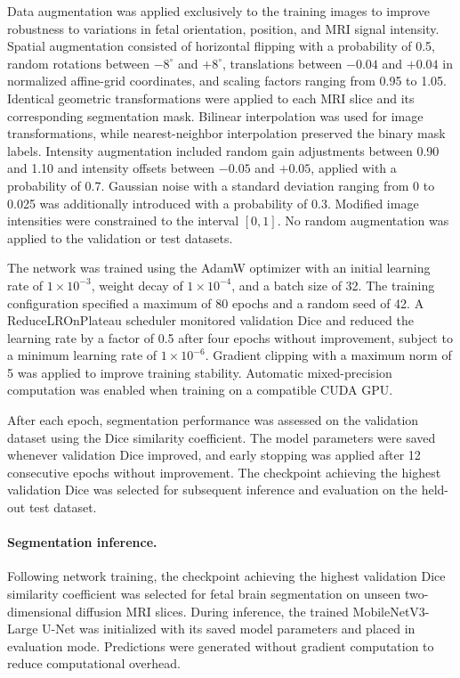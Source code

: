 Data augmentation was applied exclusively to the training images to improve robustness to variations in fetal orientation, position, and MRI signal intensity. Spatial augmentation consisted of horizontal flipping with a probability of 0.5, random rotations between $-8^\circ$ and $+8^\circ$, translations between $-0.04$ and $+0.04$ in normalized affine-grid coordinates, and scaling factors ranging from 0.95 to 1.05. Identical geometric transformations were applied to each MRI slice and its corresponding segmentation mask. Bilinear interpolation was used for image transformations, while nearest-neighbor interpolation preserved the binary mask labels. Intensity augmentation included random gain adjustments between 0.90 and 1.10 and intensity offsets between $-0.05$ and $+0.05$, applied with a probability of 0.7. Gaussian noise with a standard deviation ranging from 0 to 0.025 was additionally introduced with a probability of 0.3. Modified image intensities were constrained to the interval $[0,1]$. No random augmentation was applied to the validation or test datasets.

The network was trained using the AdamW optimizer with an initial learning rate of $1 \times 10^{-3}$, weight decay of $1 \times 10^{-4}$, and a batch size of 32. The training configuration specified a maximum of 80 epochs and a random seed of 42. A ReduceLROnPlateau scheduler monitored validation Dice and reduced the learning rate by a factor of 0.5 after four epochs without improvement, subject to a minimum learning rate of $1 \times 10^{-6}$. Gradient clipping with a maximum norm of 5 was applied to improve training stability. Automatic mixed-precision computation was enabled when training on a compatible CUDA GPU.

After each epoch, segmentation performance was assessed on the validation dataset using the Dice similarity coefficient. The model parameters were saved whenever validation Dice improved, and early stopping was applied after 12 consecutive epochs without improvement. The checkpoint achieving the highest validation Dice was selected for subsequent inference and evaluation on the held-out test dataset.

\paragraph{Segmentation inference.}
Following network training, the checkpoint achieving the highest validation Dice similarity coefficient was selected for fetal brain segmentation on unseen two-dimensional diffusion MRI slices. During inference, the trained MobileNetV3-Large U-Net was initialized with its saved model parameters and placed in evaluation mode. Predictions were generated without gradient computation to reduce computational overhead.

